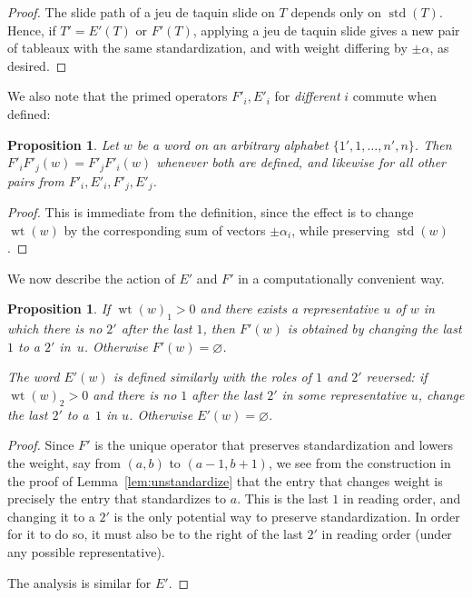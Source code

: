 \documentclass[10pt]{amsart}
\newtheorem{prop}[theorem]{Proposition}
\theoremstyle{definition}
\DeclareMathOperator{\std}{std}
\DeclareMathOperator{\wt}{wt}
\begin{document}
\begin{proof}
The slide path of a jeu de taquin slide on $T$ depends only on $\std (T)$. Hence, if $T' = E'(T)$ or $F'(T)$, applying a jeu de taquin slide gives a new pair of tableaux with the same standardization, and with weight differing by $\pm \alpha$, as desired.
\end{proof}

We also note that the primed operators $F'_i, E'_i$ for \emph{different} $i$ commute when defined:

\begin{prop} \label{prop:primed-operators-commute}
Let $w$ be a word on an arbitrary alphabet $\{1', 1, \ldots, n', n\}$. Then $F'_i F'_j(w) = F'_j F'_i(w)$ whenever both are defined, and likewise for all other pairs from $F'_i, E'_i, F'_j, E'_j$.
\end{prop}

\begin{proof}
This is immediate from the definition, since the effect is to change $\wt (w)$ by the corresponding sum of vectors $\pm \alpha_i$, while preserving $\std (w)$.
\end{proof}


We now describe the action of $E'$ and $F'$ in a computationally convenient way.

\begin{prop}\label{prop:explicit-definitions-primed}
If $\wt(w)_1>0$ and there exists a representative $u$ of $w$ in which there is no $2'$ after the last $1$, then $F'(w)$ is obtained by changing the last $1$ to a $2'$ in~$u$. Otherwise $F'(w) = \varnothing$. 

The word $E'(w)$ is defined similarly with the roles of $1$ and $2'$ reversed: if $\wt(w)_2>0$ and there is no $1$ after the last $2'$ in some representative $u$, change the last $2'$ to a~$1$ in $u$. Otherwise $E'(w) = \varnothing$.
\end{prop}

\begin{proof}
Since $F'$ is the unique operator that preserves standardization and lowers the weight, say from $(a,b)$ to $(a-1,b+1)$, we see from the construction in the proof of Lemma~\ref{lem:unstandardize} that the entry that changes weight is precisely the entry that standardizes to $a$. This is the last $1$ in reading order, and changing it to a $2'$ is the only potential way to preserve standardization. In order for it to do so, it must also be to the right of the last $2'$ in reading order (under any possible representative).

The analysis is similar for $E'$.
\end{proof}
\end{document}
